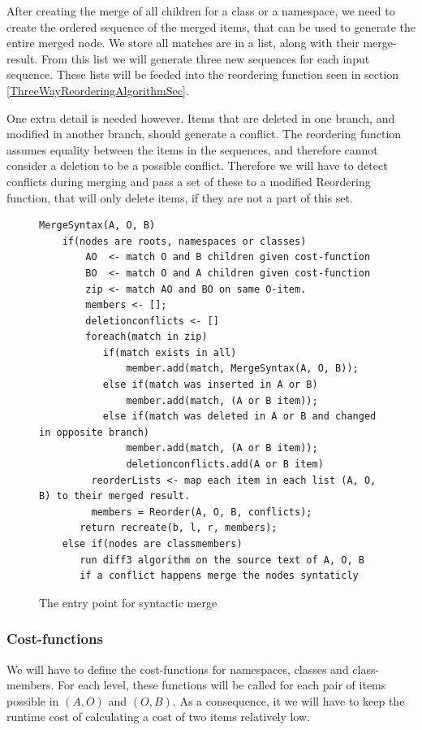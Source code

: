 \documentclass[11pt]{article}
\begin{document}
After creating the merge of all children for a class or a namespace, we need to create the ordered sequence of the merged items, that can be used to generate the entire merged node. We store all matches are in a list, along with their merge-result. From this list we will generate three new sequences for each input sequence. These lists will be feeded into the reordering function seen in section \ref{ThreeWayReorderingAlgorithmSec}.

One extra detail is needed however. Items that are deleted in one branch, and modified in another branch, should generate a conflict. The reordering function assumes equality between the items in the sequences, and therefore cannot consider a deletion to be a possible conflict. Therefore we will have to detect conflicts during merging and pass a set of these to a modified Reordering function, that will only delete items, if they are not a part of this set.

\begin{figure}
\begin{verbatim}
MergeSyntax(A, O, B)
    if(nodes are roots, namespaces or classes)
        AO  <- match O and B children given cost-function
        BO  <- match O and A children given cost-function
        zip <- match AO and BO on same O-item.
        members <- [];
        deletionconflicts <- []
        foreach(match in zip)
           if(match exists in all)
               member.add(match, MergeSyntax(A, O, B));
           else if(match was inserted in A or B)
               member.add(match, (A or B item));
           else if(match was deleted in A or B and changed in opposite branch)
               member.add(match, (A or B item));
               deletionconflicts.add(A or B item)
         reorderLists <- map each item in each list (A, O, B) to their merged result.
         members = Reorder(A, O, B, conflicts);
       return recreate(b, l, r, members);        
    else if(nodes are classmembers)
       run diff3 algorithm on the source text of A, O, B
       if a conflict happens merge the nodes syntaticly
\end{verbatim}
\caption{The entry point for syntactic merge}
\label{TreeMergeAlgorithm}
\end{figure}

\subsubsection{Cost-functions}
We will have to define the cost-functions for namespaces, classes and class-members. For each level, these functions will be called for each pair of items possible in $(A, O)$ and $(O, B)$. As a consequence, it we will have to keep the runtime cost of calculating a cost of two items relatively low.
\end{document}
